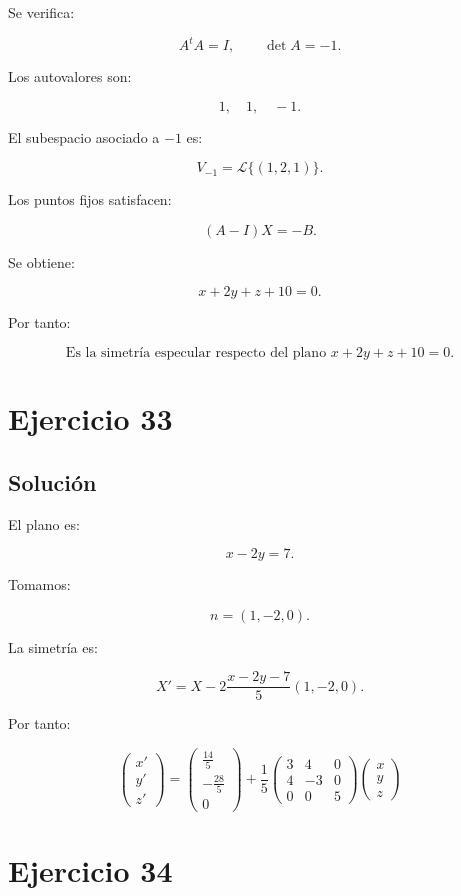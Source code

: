 \documentclass[11pt,a4paper]{article}
\begin{document}
Se verifica:

\[
A^tA=I,
\qquad
\det A=-1.
\]

Los autovalores son:

\[
1,\quad1,\quad-1.
\]

El subespacio asociado a \(-1\) es:

\[
V_{-1}
=
\mathcal L\{(1,2,1)\}.
\]

Los puntos fijos satisfacen:

\[
(A-I)X=-B.
\]

Se obtiene:

\[
x+2y+z+10=0.
\]

Por tanto:

\[
\boxed{
\text{Es la simetría especular respecto del plano }
x+2y+z+10=0.
}
\]

\section{Ejercicio 33}
\subsection{Solución}

El plano es:

\[
x-2y=7.
\]

Tomamos:

\[
n=(1,-2,0).
\]

La simetría es:

\[
X'
=
X
-
2\frac{x-2y-7}{5}(1,-2,0).
\]

Por tanto:

\[
\boxed{
\begin{pmatrix}
x'\\
y'\\
z'
\end{pmatrix}
=
\begin{pmatrix}
\frac{14}{5}\\[1mm]
-\frac{28}{5}\\[1mm]
0
\end{pmatrix}
+
\frac15
\begin{pmatrix}
3&4&0\\
4&-3&0\\
0&0&5
\end{pmatrix}
\begin{pmatrix}
x\\
y\\
z
\end{pmatrix}
}
\]

\section{Ejercicio 34}
\end{document}
